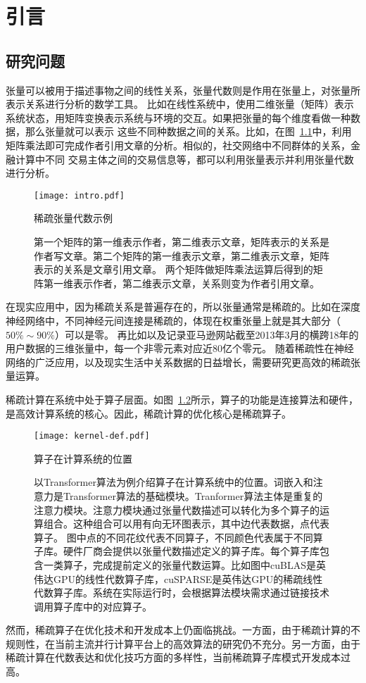 
\chapter{引言}

\section{研究问题}
张量可以被用于描述事物之间的线性关系，张量代数则是作用在张量上，对张量所表示关系进行分析的数学工具。
比如在线性系统中，使用二维张量（矩阵）表示系统状态，用矩阵变换表示系统与环境的交互。如果把张量的每个维度看做一种数据，那么张量就可以表示
这些不同种数据之间的关系。比如，在图~\ref{fig:intro}中，利用矩阵乘法即可完成作者引用文章的分析。相似的，社交网络中不同群体的关系，金融计算中不同
交易主体之间的交易信息等，都可以利用张量表示并利用张量代数进行分析。
\begin{figure}
  \centering
  \texttt{[image: intro.pdf]}
  \caption{稀疏张量代数示例}
  \caption*{第一个矩阵的第一维表示作者，第二维表示文章，矩阵表示的关系是作者写文章。第二个矩阵的第一维表示文章，第二维表示文章，矩阵表示的关系是文章引用文章。
  两个矩阵做矩阵乘法运算后得到的矩阵第一维表示作者，第二维表示文章，关系则变为作者引用文章。}
  \label{fig:intro}
\end{figure}

在现实应用中，因为稀疏关系是普遍存在的\cite{uzzi2007small}，所以张量通常是稀疏的。比如在深度神经网络中，不同神经元间连接是稀疏的，体现在权重张量上就是其大部分（$50\% \sim 90\%$）可以是零\cite{wang2021dual}。
再比如以及记录亚马逊网站截至2013年3月的横跨18年的用户数据的三维张量中，每一个非零元素对应近80亿个零元\cite{mcauley2013hidden}。
随着稀疏性在神经网络的广泛应用\cite{xiao2022smoothquant}，以及现实生活中关系数据的日益增长，需要研究更高效的稀疏张量运算。

稀疏计算在系统中处于算子层面。如图~\ref{fig:kernel-def}所示，算子的功能是连接算法和硬件，是高效计算系统的核心。因此，稀疏计算的优化核心是稀疏算子。
\begin{figure}
  \centering
  \texttt{[image: kernel-def.pdf]}
  \caption{算子在计算系统的位置}
  \caption*{以Transformer算法\cite{vaswani2017transformer}为例介绍算子在计算系统中的位置。词嵌入和注意力是Transformer算法的基础模块。Tranformer算法主体是重复的注意力模块。注意力模块通过张量代数描述可以转化为多个算子的运算组合。这种组合可以用有向无环图表示，其中边代表数据，点代表算子。
  图中点的不同花纹代表不同算子，不同颜色代表属于不同算子库。硬件厂商会提供以张量代数描述定义的算子库。每个算子库包含一类算子，完成提前定义的张量代数运算。比如图中cuBLAS\cite{cuBLAS}是英伟达GPU的线性代数算子库，cuSPARSE\cite{naumov2010cusparse}是英伟达GPU的稀疏线性代数算子库。系统在实际运行时，会根据算法模块需求通过链接技术调用算子库中的对应算子。}
  \label{fig:kernel-def}
\end{figure}
然而，稀疏算子在优化技术和开发成本上仍面临挑战。一方面，由于稀疏计算的不规则性，在当前主流并行计算平台上的高效算法的研究仍不充分。另一方面，由于稀疏计算在代数表达和优化技巧方面的多样性，当前稀疏算子库模式开发成本过高。

